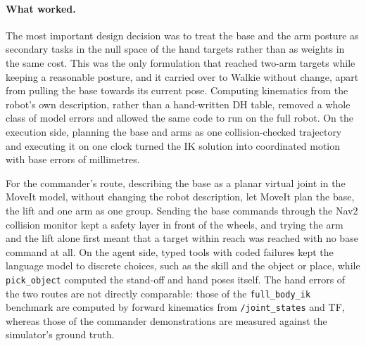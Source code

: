 \documentclass[12pt,a4paper]{article}
\begin{document}
\paragraph{What worked.}
The most important design decision was to treat the base and the arm posture as secondary tasks in the
null space of the hand targets rather than as weights in the same cost. This was the only formulation
that reached two-arm targets while keeping a reasonable posture, and it carried over to Walkie without
change, apart from pulling the base towards its current pose. Computing kinematics from the robot's own
description, rather than a hand-written DH table, removed a whole class of model errors and allowed the
same code to run on the full robot. On the execution side, planning the base and arms as one
collision-checked trajectory and executing it on one clock turned the IK solution into coordinated
motion with base errors of millimetres.


For the commander's route, describing the base as a planar virtual joint in the MoveIt model, without
changing the robot description, let MoveIt plan the base, the lift and one arm as one group. Sending
the base commands through the Nav2 collision monitor kept a safety layer in front of the wheels, and
trying the arm and the lift alone first meant that a target within reach was reached with no base
command at all. On the agent side, typed tools with coded failures kept the language model to
discrete choices, such as the skill and the object or place, while \texttt{pick\_object} computed the
stand-off and hand poses itself. The hand errors of the two routes are not directly comparable: those
of the \texttt{full\_body\_ik} benchmark are computed by forward kinematics from
\texttt{/joint\_states} and TF, whereas those of the commander demonstrations are measured against
the simulator's ground truth.
\end{document}

